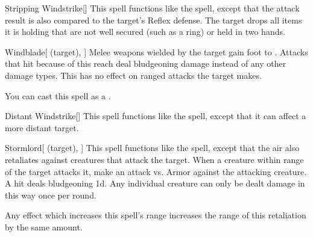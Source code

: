 \lowercase{\hypertarget{spell:Stripping Windstrike}{}}\label{spell:Stripping Windstrike}
\begin{freeability}[\nth{2}]{\hypertarget{spell:Stripping Windstrike}{Stripping Windstrike}}[]
This spell functions like the  spell, except that the attack result is also compared to the target's Reflex defense.
\hit The target drops all items it is holding that are not well secured (such as a ring) or held in two hands.
\end{freeability}
\vspace{0.25em}



\lowercase{\hypertarget{spell:Windblade}{}}\label{spell:Windblade}
\begin{attuneability}[\nth{2}]{\hypertarget{spell:Windblade}{Windblade}}[ (target), ]
Melee weapons wielded by the target gain  foot  to .
Attacks that hit because of this reach deal bludgeoning damage instead of any other damage types.
This has no effect on ranged attacks the target makes.

You can cast this spell as a .
\end{attuneability}
\vspace{0.25em}



\lowercase{\hypertarget{spell:Distant Windstrike}{}}\label{spell:Distant Windstrike}
\begin{freeability}[\nth{3}]{\hypertarget{spell:Distant Windstrike}{Distant Windstrike}}[]
This spell functions like the  spell, except that it can affect a more distant target.
\end{freeability}
\vspace{0.25em}



\lowercase{\hypertarget{spell:Stormlord}{}}\label{spell:Stormlord}
\begin{attuneability}[\nth{3}]{\hypertarget{spell:Stormlord}{Stormlord}}[ (target), ]
This spell functions like the  spell, except that the air also retaliates against creatures that attack the target.
When a creature within \rngclose range of the target attacks it, make an attack vs. Armor against the attacking creature.
A hit deals bludgeoning  \minus1d.
Any individual creature can only be dealt damage in this way once per round.

Any effect which increases this spell's range increases the range of this retaliation by the same amount.
\end{attuneability}
\vspace{0.25em}



